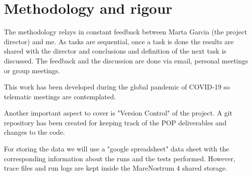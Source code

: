 \section{Methodology and rigour}

\justify
The methodology relays in constant feedback between Marta Garcia (the project director) and me. As tasks are sequential, once a task is done the results are shared with the director and conclusions and definition of the next task is discussed. The feedback and the discussion are done via email, personal meetings or group meetings.

\justify
This work has been developed during the global pandemic of COVID-19 so telematic meetings are contemplated.

\justify
Another important aspect to cover is "Version Control" of the project. A git repository has been created for keeping track of the POP deliverables and changes to the code.

\justify
For storing the data we will use a "google  spreadsheet" data sheet with the corresponding information about the runs and the tests performed. However, trace files and run logs are kept inside the MareNostrum 4 shared storage.

\clearpage
